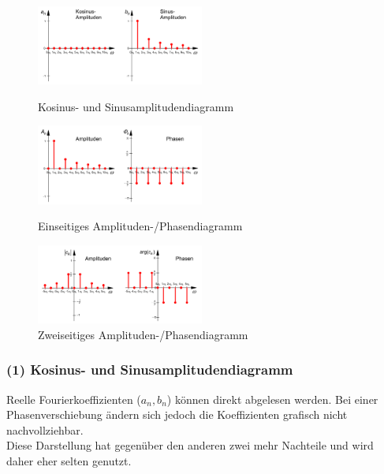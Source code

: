 
\begin{figure}[htbp]
  \centering
  \begin{minipage}[b]{5.5cm}
    \includegraphics[width=5.5cm]{./bilder/spektren_cossin.png}
    \caption{Kosinus- und Sinusamplitudendiagramm} 
  \end{minipage}
  \hspace{1cm}
  \begin{minipage}[b]{5.5cm}
    \includegraphics[width=5.5cm]{./bilder/spektren_einseitig.png} 
    \caption{Einseitiges Amplituden-/Phasendiagramm} 
  \end{minipage}
  \hspace{1cm}
  \begin{minipage}[b]{5.5cm}
    \includegraphics[width=5.5cm]{./bilder/spektren_zweiseitig.png} 
    \caption{Zweiseitiges Amplituden-/Phasendiagramm} 
  \end{minipage}
\end{figure}

\subsubsection{(1) Kosinus- und Sinusamplitudendiagramm} 
Reelle Fourierkoeffizienten ($a_n, b_n$) können direkt abgelesen werden. 
Bei einer Phasenverschiebung ändern sich jedoch die Koeffizienten grafisch nicht nachvollziehbar. \\
Diese Darstellung hat gegenüber den anderen zwei mehr Nachteile und wird daher eher selten genutzt.

